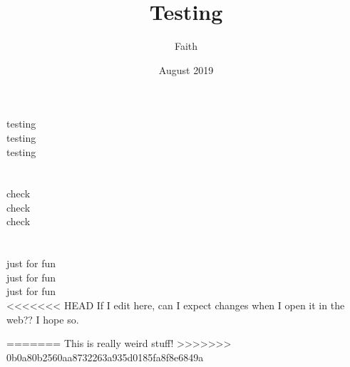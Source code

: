 \documentclass{article}
\title{Testing}
\date{August 2019}
\author{Faith}
\begin{document}
\maketitle
testing \\
testing\\
testing\\
\\
\\
check\\
check\\
check\\
\\
\\
just for fun
\\
just for fun
\\
just for fun
\\

<<<<<<< HEAD
If I edit here, can I expect changes when I open it in the web?? I hope so.


=======
This is really weird stuff!
>>>>>>> 0b0a80b2560aa8732263a935d0185fa8f8e6849a
\end{document}
